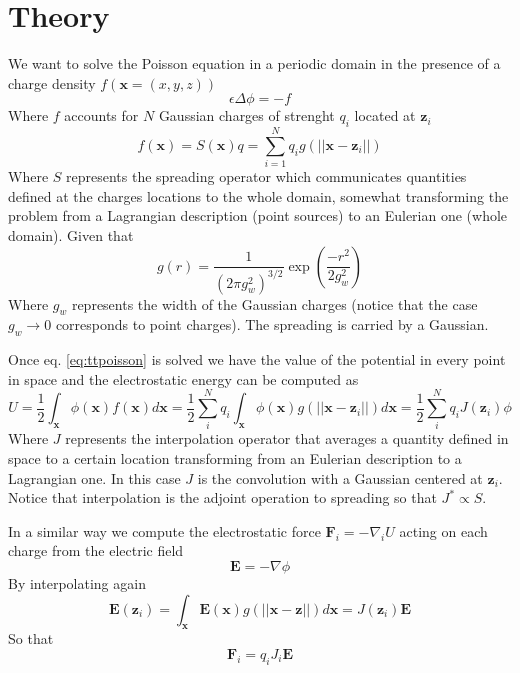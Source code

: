 \documentclass[ twoside,openright,titlepage,numbers=noenddot,%
headinclude,footinclude,cleardoublepage=empty,abstract=on,
BCOR=5mm,paper=a4,fontsize=11pt
]{scrreprt}
\renewcommand{\vec}[1]{\bm{#1}}
\begin{document}
\section{Theory} \label{sec:tppoisson_theory}
We want to solve the Poisson equation in a periodic domain in the presence of a charge density $f(\vec{x}=(x,y,z))$
\begin{equation}
  \label{eq:ttpoisson}
 \epsilon\Delta\phi=-f
\end{equation}
Where $f$ accounts for $N$ Gaussian charges of strenght $q_i$ located at $\vec{z}_i$ 
\begin{equation}
  \label{eq:tppoisson_cdens}
  f(\vec{x})= S(\vec{x})q = \sum_{i=1}^Nq_ig(||\vec{x}-\vec{z}_i||)
\end{equation}
Where $S$ represents the spreading operator which communicates quantities defined at the charges locations to the whole domain, somewhat transforming the problem from a Lagrangian description (point sources) to an Eulerian one (whole domain). Given that
\begin{equation}
  \label{eq:tpppoisson_gaussiansource}
 g(r)=\frac{1}{\left(2\pi g_w^2\right)^{3/2}}\exp{\left(\frac{-r^2}{2g_w^2}\right)}
\end{equation}
Where $g_w$ represents the width of the Gaussian charges (notice that the case $g_w\rightarrow 0$ corresponds to point charges).
The spreading is carried by a Gaussian.

Once eq. \eqref{eq:ttpoisson} is solved we have the value of the potential in every point in space and the electrostatic energy can be computed as
\begin{equation}
  \label{tppoisson_avgpot}
  U = \frac{1}{2}\int_{\vec{x}}{ \phi(\vec{x}) f(\vec{x}) d\vec{x}} = \frac{1}{2}\sum_i^N{q_i\int_{\vec{x}}\phi(\vec{x})g(||\vec{x}-\vec{z}_i||) d\vec{x}} = \frac{1}{2}\sum_i^N{q_iJ(\vec{z}_i)\phi}
\end{equation}
Where $J$ represents the interpolation operator that averages a quantity defined in space to a certain location transforming from an Eulerian description to a Lagrangian one. In this case $J$ is the convolution with a Gaussian centered at $\vec{z}_i$. Notice that interpolation is the adjoint operation to spreading so that $J^{*} \propto S$.

In a similar way we compute the electrostatic force $\vec{F}_i = -\nabla_i{U}$ acting on each charge from the electric field
\begin{equation}
  \vec{E} = -\nabla{\phi} 
\end{equation}
By interpolating again
\begin{equation}
  \label{tppoisson_avgfield}
\vec{E}(\vec{z}_i) = \int_{\vec{x}}{\vec{E}(\vec{x})g(||\vec{x}-\vec{z}||)d\vec{x}} = J(\vec{z}_i)\vec{E} %
\end{equation}
So that
\begin{equation}
\vec{F}_i = q_iJ_i\vec{E}%
\end{equation}
\end{document}
